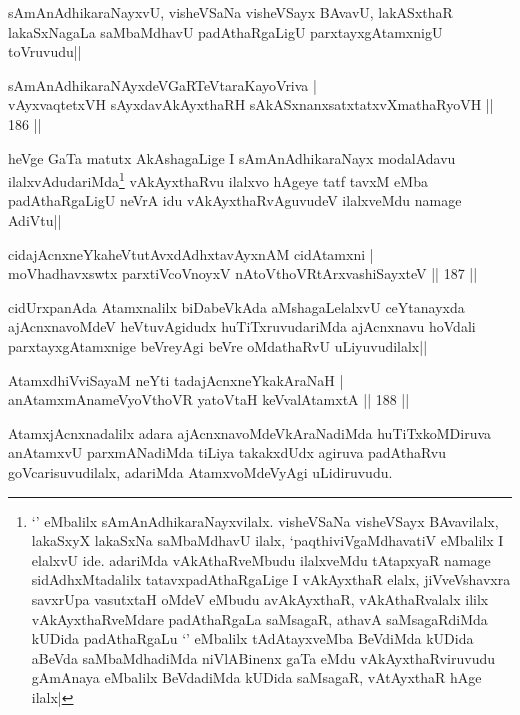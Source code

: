 \begin{artha}
sAmAnAdhikaraNayxvU, visheVSaNa visheVSayx BAvavU, lakASxthaR lakaSxNagaLa saMbaMdhavU padAthaRgaLigU parxtayxgAtamxnigU toVruvudu||
\end{artha}


\begin{shl}
sAmAnAdhikaraNAyxdeVGaRTeVtaraKayoVriva |\\
vAyxvaqtetxVH sAyxdavAkAyxthaRH sAkASxnanxsatxtatxvXmathaRyoVH \hfill || 186 ||
\end{shl}

\begin{artha}
heVge GaTa matutx AkAshagaLige I sAmAnAdhikaraNayx modalAdavu ilalxvAdudariMda\footnote[1]{`\stext ' eMbalilx sAmAnAdhikaraNayxvilalx. visheVSaNa visheVSayx BAvavilalx, lakaSxyX lakaSxNa saMbaMdhavU ilalx, `paqthiviVgaMdhavatiV eMbalilx I elalxvU ide. adariMda vAkAthaRveMbudu ilalxveMdu tAtapxyaR namage sidAdhxMtadalilx tatavxpadAthaRgaLige I vAkAyxthaR elalx, jiVveVshavxra savxrUpa vasutxtaH oMdeV eMbudu avAkAyxthaR, vAkAthaRvalalx ililx vAkAyxthaRveMdare padAthaRgaLa saMsagaR, athavA saMsagaRdiMda kUDida padAthaRgaLu `\stext ' eMbalilx tAdAtayxveMba BeVdiMda kUDida aBeVda saMbaMdhadiMda niVlABinenx gaTa eMdu vAkAyxthaRviruvudu gAmAnaya eMbalilx BeVdadiMda kUDida saMsagaR, vAtAyxthaR hAge ilalx|} vAkAyxthaRvu ilalxvo hAgeye tatf tavxM eMba padAthaRgaLigU neVrA idu vAkAyxthaRvAguvudeV ilalxveMdu namage AdiVtu||
\end{artha}

\begin{shl}
cidajAcnxneYkaheVtutAvxdAdhxtavAyxnAM cidAtamxni |\\
moVhadhavxswtx parxtiVcoV\s noyxV nAtoV\s thoVR\s tArxvashiSayxteV \hfill || 187 ||
\end{shl}

\begin{artha}
cidUrxpanAda Atamxnalilx biDabeVkAda aMshagaLelalxvU ceYtanayxda ajAcnxnavoMdeV heVtuvAgidudx huTiTxruvudariMda ajAcnxnavu hoVdali parxtayxgAtamxnige beVreyAgi beVre oMdathaRvU uLiyuvudilalx||
\end{artha}


\begin{shl}
AtamxdhiVviSayaM neYti tadajAcnxneYkakAraNaH |\\
anAtamxmAnameVyoV\s thoVR yatoV\s taH keVvalAtamxtA \hfill || 188 ||
\end{shl}

\begin{artha}
AtamxjAcnxnadalilx adara ajAcnxnavoMdeVkAraNadiMda huTiTxkoMDiruva anAtamxvU parxmANadiMda tiLiya takakxdUdx agiruva padAthaRvu goVcarisuvudilalx, adariMda AtamxvoMdeVyAgi uLidiruvudu.
\end{artha}
